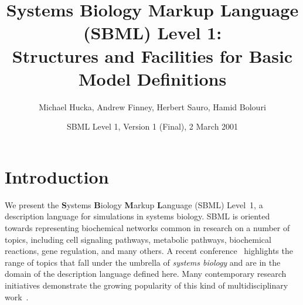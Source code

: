 \documentclass[10pt]{cekarticle}
\begin{document}

\title{Systems Biology Markup Language (SBML) Level 1:\\
  Structures and Facilities for Basic Model Definitions}

\author{Michael Hucka, Andrew Finney, Herbert Sauro, Hamid Bolouri}


\address{Systems Biology Workbench Development Group\\
  ERATO Kitano Systems Biology Project\\
  Control and Dynamical Systems, MC 107-81\\
  California Institute of Technology, Pasadena, CA 91125, USA\\[3pt]
  \url{http://www.cds.caltech.edu/erato}}


\date{SBML Level 1, Version 1 (Final), 2 March 2001}

\maketitlepage


\section{Introduction}
\label{sec:introduction}

We present the \textbf{S}ystems \textbf{B}iology \textbf{M}arkup
\textbf{L}anguage (SBML) Level~1, a description language for simulations in
systems biology.  SBML is oriented towards representing biochemical
networks common in research on a number of topics, including cell signaling
pathways, metabolic pathways, biochemical reactions, gene regulation, and
many others.  A recent conference~\citep{kitano:2001} highlights the range
of topics that fall under the umbrella of \emph{systems biology} and are in
the domain of the description language defined here.  Many contemporary
research initiatives demonstrate the growing popularity of this kind of
multidisciplinary
work~\cite[e.g.,][]{abbott:1999,gilman:2000,popel:1998,smaglik:2000,smaglik:2000b}.
\end{document}
